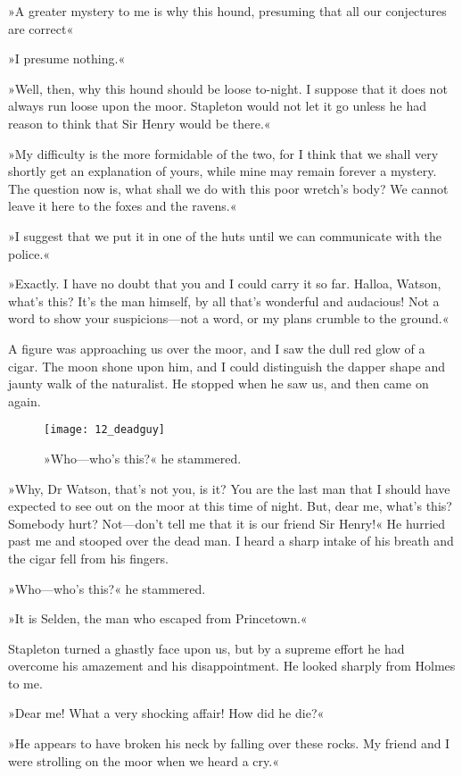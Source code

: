 »A greater mystery to me is why this hound, presuming that all our conjectures are correct\longdash«

»I presume nothing.«

»Well, then, why this hound should be loose to-night. I suppose that it does not always run loose upon the moor. Stapleton would not let it go unless he had reason to think that Sir Henry would be there.«

»My difficulty is the more formidable of the two, for I think that we shall very shortly get an explanation of yours, while mine may remain forever a mystery. The question now is, what shall we do with this poor wretch's body? We cannot leave it here to the foxes and the ravens.«

»I suggest that we put it in one of the huts until we can communicate with the police.«

»Exactly. I have no doubt that you and I could carry it so far. Halloa, Watson, what's this? It's the man himself, by all that's wonderful and audacious! Not a word to show your suspicions—not a word, or my plans crumble to the ground.«

A figure was approaching us over the moor, and I saw the dull red glow of a cigar. The moon shone upon him, and I could distinguish the dapper shape and jaunty walk of the naturalist. He stopped when he saw us, and then came on again.

\begin{figure}[tbph]
\centering
\texttt{[image: 12\_deadguy]}
\caption{»Who—who's this?« he stammered.}
\end{figure}

»Why, Dr Watson, that's not you, is it? You are the last man that I should have expected to see out on the moor at this time of night. But, dear me, what's this? Somebody hurt? Not—don't tell me that it is our friend Sir Henry!« He hurried past me and stooped over the dead man. I heard a sharp intake of his breath and the cigar fell from his fingers.

»Who—who's this?« he stammered.

»It is Selden, the man who escaped from Princetown.«

Stapleton turned a ghastly face upon us, but by a supreme effort he had overcome his amazement and his disappointment. He looked sharply from Holmes to me.

»Dear me! What a very shocking affair! How did he die?«

»He appears to have broken his neck by falling over these rocks. My friend and I were strolling on the moor when we heard a cry.«

